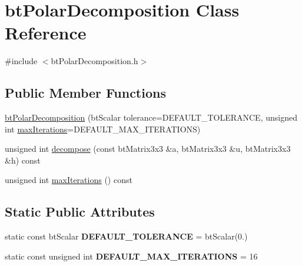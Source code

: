 \hypertarget{classbt_polar_decomposition}{\section{bt\+Polar\+Decomposition Class Reference}
\label{classbt_polar_decomposition}
}


{\ttfamily \#include $<$bt\+Polar\+Decomposition.\+h$>$}

\subsection*{Public Member Functions}
\begin{DoxyCompactItemize}
\item 
\hyperlink{classbt_polar_decomposition_aa346e3dcc8867ebd3944b51ab5b7fb1f}{bt\+Polar\+Decomposition} (bt\+Scalar tolerance=D\+E\+F\+A\+U\+L\+T\+\_\+\+T\+O\+L\+E\+R\+A\+N\+C\+E, unsigned int \hyperlink{classbt_polar_decomposition_ac999bd3afdcc94a43ddbea028b5d4867}{max\+Iterations}=D\+E\+F\+A\+U\+L\+T\+\_\+\+M\+A\+X\+\_\+\+I\+T\+E\+R\+A\+T\+I\+O\+N\+S)
\item 
unsigned int \hyperlink{classbt_polar_decomposition_a6ab0c88b30522ab42b6202a2f7a17eab}{decompose} (const bt\+Matrix3x3 \&a, bt\+Matrix3x3 \&u, bt\+Matrix3x3 \&h) const 
\item 
unsigned int \hyperlink{classbt_polar_decomposition_ac999bd3afdcc94a43ddbea028b5d4867}{max\+Iterations} () const 
\end{DoxyCompactItemize}
\subsection*{Static Public Attributes}
\begin{DoxyCompactItemize}
\item 
\hypertarget{classbt_polar_decomposition_a12a01581f129acf4b52128463ed2a839}{static const bt\+Scalar {\bfseries D\+E\+F\+A\+U\+L\+T\+\_\+\+T\+O\+L\+E\+R\+A\+N\+C\+E} = bt\+Scalar(0.)}\label{classbt_polar_decomposition_a12a01581f129acf4b52128463ed2a839}

\item 
\hypertarget{classbt_polar_decomposition_af5a6809af029f7f5af20de124e243b2d}{static const unsigned int {\bfseries D\+E\+F\+A\+U\+L\+T\+\_\+\+M\+A\+X\+\_\+\+I\+T\+E\+R\+A\+T\+I\+O\+N\+S} = 16}\label{classbt_polar_decomposition_af5a6809af029f7f5af20de124e243b2d}

\end{DoxyCompactItemize}


